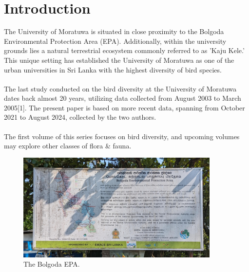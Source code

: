 \chapter{Introduction}
\label{cp:introduction}
The University of Moratuwa is situated in close proximity to the Bolgoda Environmental Protection Area (EPA). Additionally, within the university grounds lies a natural terrestrial ecosystem commonly referred to as 'Kaju Kele.' This unique setting has established the University of Moratuwa as one of the urban universities in Sri Lanka with the highest diversity of bird species.
\\\\
The last study conducted on the bird diversity at the University of Moratuwa dates back almost 20 years, utilizing data collected from August 2003 to March 2005[1]. The present paper is based on more recent data, spanning from October 2021 to August 2024, collected by the two authors.
\\\\
The first volume of this series focuses on bird diversity, and upcoming volumes may explore other classes of flora \& fauna.
\begin{figure}[!htpb]
    \centering
    \includegraphics[width=0.9\textwidth]{Figures/epa.jpg}
    \caption[]{The Bolgoda EPA.}
    \label{fig:figure-01}
\end{figure}

